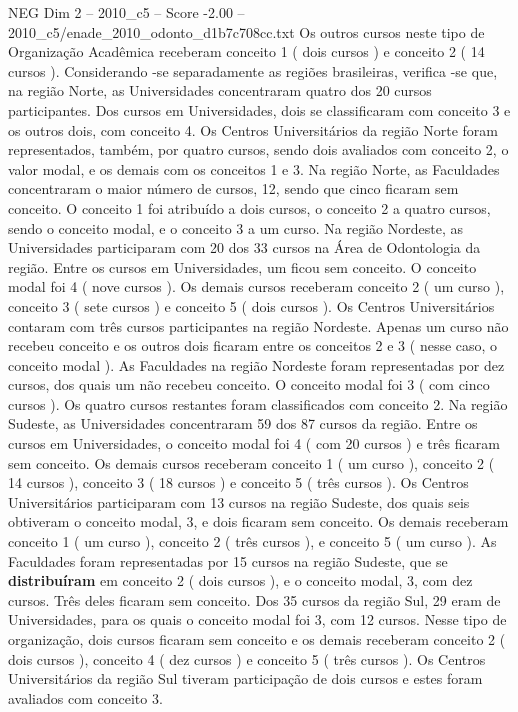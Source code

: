 \begin{textsample}{NEG Dim 2 – 2010\_c5 – Score -2.00 – 2010\_c5/enade\_2010\_odonto\_d1b7c708cc.txt}
Os outros cursos neste tipo de Organização Acadêmica receberam conceito 1 ( dois cursos ) e conceito 2 ( 14 cursos ).
Considerando -se separadamente as regiões brasileiras, verifica -se que, na região Norte, as Universidades concentraram quatro dos 20 cursos participantes.
Dos cursos em Universidades, dois se classificaram com conceito 3 e os outros dois, com conceito 4.
Os Centros Universitários da região Norte foram representados, também, por quatro cursos, sendo dois avaliados com conceito 2, o valor modal, e os demais com os conceitos 1 e 3.
Na região Norte, as Faculdades concentraram o maior número de cursos, 12, sendo que cinco ficaram sem conceito.
O conceito 1 foi atribuído a dois cursos, o conceito 2 a quatro cursos, sendo o conceito modal, e o conceito 3 a um curso.
Na região Nordeste, as Universidades participaram com 20 dos 33 cursos na Área de Odontologia da região.
Entre os cursos em Universidades, um ficou sem conceito.
O conceito modal foi 4 ( nove cursos ).
Os demais cursos receberam conceito 2 ( um curso ), conceito 3 ( sete cursos ) e conceito 5 ( dois cursos ).
Os Centros Universitários contaram com três cursos participantes na região Nordeste.
Apenas um curso não recebeu conceito e os outros dois ficaram entre os conceitos 2 e 3 ( nesse caso, o conceito modal ).
As Faculdades na região Nordeste foram representadas por dez cursos, dos quais um não recebeu conceito.
O conceito modal foi 3 ( com cinco cursos ).
Os quatro cursos restantes foram classificados com conceito 2.
Na região Sudeste, as Universidades concentraram 59 dos 87 cursos da região.
Entre os cursos em Universidades, o conceito modal foi 4 ( com 20 cursos ) e três ficaram sem conceito.
Os demais cursos receberam conceito 1 ( um curso ), conceito 2 ( 14 cursos ), conceito 3 ( 18 cursos ) e conceito 5 ( três cursos ).
Os Centros Universitários participaram com 13 cursos na região Sudeste, dos quais seis obtiveram o conceito modal, 3, e dois ficaram sem conceito.
Os demais receberam conceito 1 ( um curso ), conceito 2 ( três cursos ), e conceito 5 ( um curso ).
As Faculdades foram representadas por 15 cursos na região Sudeste, que se \textbf{distribuíram} em conceito 2 ( dois cursos ), e o conceito modal, 3, com dez cursos.
Três deles ficaram sem conceito.
Dos 35 cursos da região Sul, 29 eram de Universidades, para os quais o conceito modal foi 3, com 12 cursos.
Nesse tipo de organização, dois cursos ficaram sem conceito e os demais receberam conceito 2 ( dois cursos ), conceito 4 ( dez cursos ) e conceito 5 ( três cursos ).
Os Centros Universitários da região Sul tiveram participação de dois cursos e estes foram avaliados com conceito 3.

\end{textsample}
